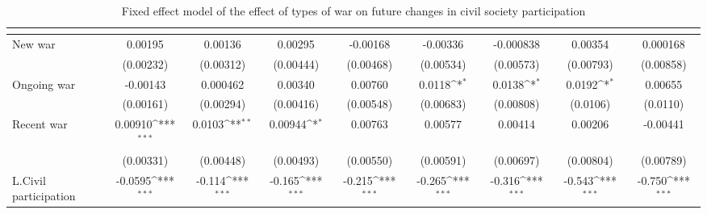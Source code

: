 \begin{table}[htbp]\centering
\def\sym#1{\ifmmode^{#1}\else\(^{#1}\)\fi}
\caption{Fixed effect model of the effect of types of war on future changes in civil society participation \label{fecivilparticip}}
\begin{tabular}{l*{8}{c}}
\hline\hline
                    &&&&&&&&\\
\hline
New war             &     0.00195         &     0.00136         &     0.00295         &    -0.00168         &    -0.00336         &   -0.000838         &     0.00354         &    0.000168         \\
                    &   (0.00232)         &   (0.00312)         &   (0.00444)         &   (0.00468)         &   (0.00534)         &   (0.00573)         &   (0.00793)         &   (0.00858)         \\
[1em]
Ongoing war         &    -0.00143         &    0.000462         &     0.00340         &     0.00760         &      0.0118\sym{*}  &      0.0138\sym{*}  &      0.0192\sym{*}  &     0.00655         \\
                    &   (0.00161)         &   (0.00294)         &   (0.00416)         &   (0.00548)         &   (0.00683)         &   (0.00808)         &    (0.0106)         &    (0.0110)         \\
[1em]
Recent war          &     0.00910\sym{***}&      0.0103\sym{**} &     0.00944\sym{*}  &     0.00763         &     0.00577         &     0.00414         &     0.00206         &    -0.00441         \\
                    &   (0.00331)         &   (0.00448)         &   (0.00493)         &   (0.00550)         &   (0.00591)         &   (0.00697)         &   (0.00804)         &   (0.00789)         \\
[1em]
L.Civil participation&     -0.0595\sym{***}&      -0.114\sym{***}&      -0.165\sym{***}&      -0.215\sym{***}&      -0.265\sym{***}&      -0.316\sym{***}&      -0.543\sym{***}&      -0.750\sym{***}\\

\end{tabular}
\end{table}
